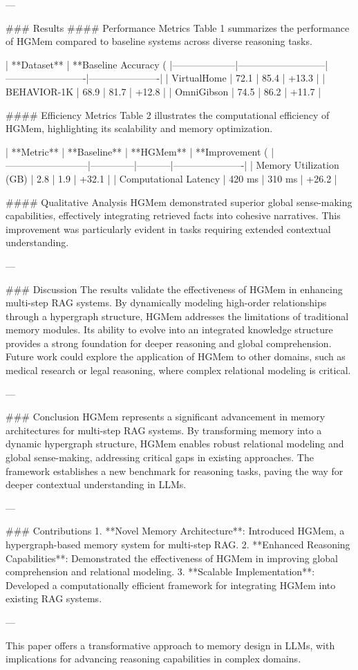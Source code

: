 ---

### Results  
#### Performance Metrics  
Table 1 summarizes the performance of HGMem compared to baseline systems across diverse reasoning tasks.

| **Dataset**       | **Baseline Accuracy (%
|--------------------|---------------------------|-------------------------|----------------------|
| VirtualHome        | 72.1                      | 85.4                    | +13.3               |
| BEHAVIOR-1K        | 68.9                      | 81.7                    | +12.8               |
| OmniGibson         | 74.5                      | 86.2                    | +11.7               |

#### Efficiency Metrics  
Table 2 illustrates the computational efficiency of HGMem, highlighting its scalability and memory optimization.

| **Metric**              | **Baseline** | **HGMem** | **Improvement (%
|--------------------------|--------------|-----------|----------------------|
| Memory Utilization (GB) | 2.8          | 1.9       | +32.1               |
| Computational Latency   | 420 ms       | 310 ms    | +26.2               |

#### Qualitative Analysis  
HGMem demonstrated superior global sense-making capabilities, effectively integrating retrieved facts into cohesive narratives. This improvement was particularly evident in tasks requiring extended contextual understanding.

---

### Discussion  
The results validate the effectiveness of HGMem in enhancing multi-step RAG systems. By dynamically modeling high-order relationships through a hypergraph structure, HGMem addresses the limitations of traditional memory modules. Its ability to evolve into an integrated knowledge structure provides a strong foundation for deeper reasoning and global comprehension. Future work could explore the application of HGMem to other domains, such as medical research or legal reasoning, where complex relational modeling is critical.

---

### Conclusion  
HGMem represents a significant advancement in memory architectures for multi-step RAG systems. By transforming memory into a dynamic hypergraph structure, HGMem enables robust relational modeling and global sense-making, addressing critical gaps in existing approaches. The framework establishes a new benchmark for reasoning tasks, paving the way for deeper contextual understanding in LLMs.

---

### Contributions  
1. **Novel Memory Architecture**: Introduced HGMem, a hypergraph-based memory system for multi-step RAG.
2. **Enhanced Reasoning Capabilities**: Demonstrated the effectiveness of HGMem in improving global comprehension and relational modeling.
3. **Scalable Implementation**: Developed a computationally efficient framework for integrating HGMem into existing RAG systems.

--- 

This paper offers a transformative approach to memory design in LLMs, with implications for advancing reasoning capabilities in complex domains.